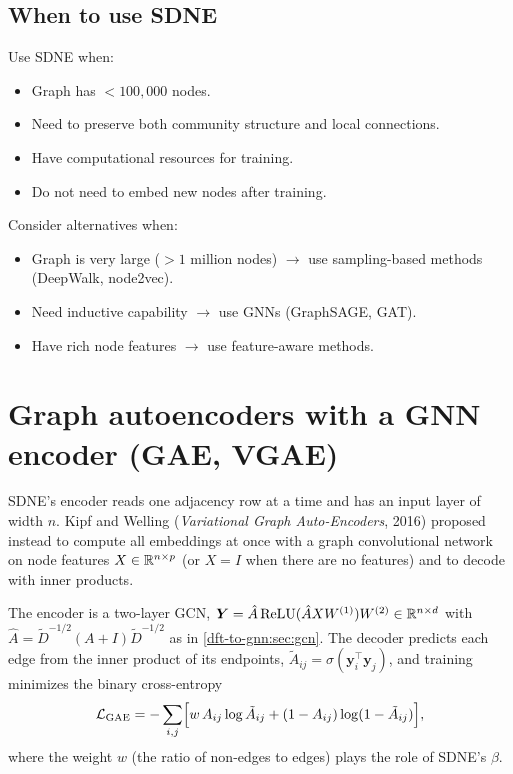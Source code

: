 \begin{notechapter}
\subsection{When to use SDNE}

Use SDNE when:
\begin{itemize}
    \item Graph has $<100{,}000$ nodes.
    \item Need to preserve both community structure and local connections.
    \item Have computational resources for training.
    \item Do not need to embed new nodes after training.
\end{itemize}

Consider alternatives when:
\begin{itemize}
    \item Graph is very large ($>1$ million nodes) $\rightarrow$ use sampling-based methods (DeepWalk, node2vec).
    \item Need inductive capability $\rightarrow$ use GNNs (GraphSAGE, GAT).
    \item Have rich node features $\rightarrow$ use feature-aware methods.
\end{itemize}

\section{Graph autoencoders with a GNN encoder (GAE, VGAE)}

SDNE's encoder reads one adjacency row at a time and has an input layer of width $n$. Kipf and Welling (\emph{Variational Graph Auto-Encoders}, 2016) proposed instead to compute all embeddings at once with a graph convolutional network on node features $X \in \mathbb{R}^{n\times p}$ (or $X = I$ when there are no features) and to decode with inner products.

\begin{definition}
The encoder is a two-layer GCN, $\bm Y = \hat A\,\mathrm{ReLU}(\hat AXW^{(1)})W^{(2)} \in \mathbb{R}^{n\times d}$ with $\hat A = \tilde D^{-1/2}(A + I)\tilde D^{-1/2}$ as in \cref{dft-to-gnn:sec:gcn}. The decoder predicts each edge from the inner product of its endpoints, $\tilde A_{ij} = \sigma(\bm y_i^\top\bm y_j)$, and training minimizes the binary cross-entropy
\[
\mathcal L_{\text{GAE}} = -\sum_{i,j}\Bigl[w\,A_{ij}\log\tilde A_{ij} + (1 - A_{ij})\log(1 - \tilde A_{ij})\Bigr],
\]
where the weight $w$ (the ratio of non-edges to edges) plays the role of SDNE's $\beta$.
\end{definition}


\end{notechapter}
